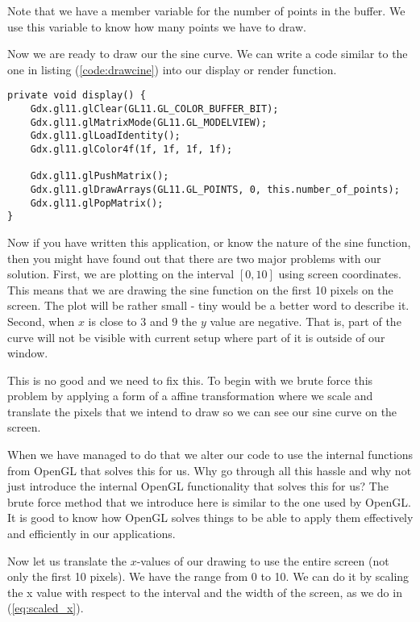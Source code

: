 \documentclass[11pt,a4paper]{article}
\begin{document}
Note that we have a member variable for the number of points in the buffer. We
use this variable to know how many points we have to draw.

Now we are ready to draw our the sine curve. We can write a code similar to the
one in listing (\ref{code:drawcine}) into our display or render function.


\begin{lstlisting}[texcl, label=code:drawcine, caption=Drawing the sine curve]
private void display() {
    Gdx.gl11.glClear(GL11.GL_COLOR_BUFFER_BIT);
    Gdx.gl11.glMatrixMode(GL11.GL_MODELVIEW);
    Gdx.gl11.glLoadIdentity();
    Gdx.gl11.glColor4f(1f, 1f, 1f, 1f);
    
    Gdx.gl11.glPushMatrix();
    Gdx.gl11.glDrawArrays(GL11.GL_POINTS, 0, this.number_of_points);
    Gdx.gl11.glPopMatrix();	
}
\end{lstlisting}

Now if you have written this application, or know the nature of the sine
function, then you might have found out that there are two major problems with
our solution. First, we are plotting on the interval $[0, 10]$ using screen
coordinates. This means that we are drawing the sine function on the first 10
pixels on the screen. The plot will be rather small - tiny would be a better
word to describe it. Second, when $x$ is close to $3$ and $9$ the $y$ value are
negative. That is, part of the curve will not be visible with current setup
where part of it is outside of our window.

This is no good and we need to fix this. To begin with we brute force this
problem by applying a form of a affine transformation where we scale and
translate the pixels that we intend to draw so we can see our sine curve on the
screen.

When we have managed to do that we alter our code to use the internal functions
from OpenGL that solves this for us. Why go through all this hassle and why not
just introduce the internal OpenGL functionality that solves this for us? The
brute force method that we introduce here is similar to the one used by OpenGL.
It is good to know how OpenGL solves things to be able to apply them
effectively and efficiently in our applications.

Now let us translate the $x$-values of our drawing to use the entire screen
(not only the first 10 pixels). We have the range from 0 to 10. We can do it by
scaling the x value with respect to the interval and the width of the screen,
as we do in (\ref{eq:scaled_x}).
\end{document}

